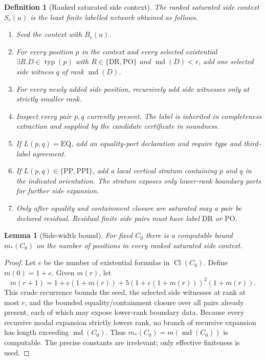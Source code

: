 \documentclass[11pt]{article}
\newtheorem{lemma}[theorem]{Lemma}
\newtheorem{definition}[theorem]{Definition}
\newcommand{\Cl}{\operatorname{Cl}}
\newcommand{\md}{\operatorname{md}}
\newcommand{\typ}{\operatorname{typ}}
\newcommand{\PP}{\mathrm{PP}}
\newcommand{\PPI}{\mathrm{PPI}}
\newcommand{\DR}{\mathrm{DR}}
\newcommand{\PO}{\mathrm{PO}}
\newcommand{\EQ}{\mathrm{EQ}}
\begin{document}
\begin{definition}[Ranked saturated side context]
\label{def:ranked-side}
The ranked saturated side context $S_r(u)$ is the least finite labelled network obtained as follows.
\begin{enumerate}[label=(S\arabic*)]
\item Seed the context with $B_r(u)$.
\item For every position $p$ in the context and every selected existential $\exists R.D\in\typ(p)$ with $R\in\{\DR,\PO\}$ and $\md(D)<r$, add one selected side witness $q$ of rank $\md(D)$.
\item For every newly added side position, recursively add side witnesses only at strictly smaller rank.
\item Inspect every pair $p,q$ currently present.  The label is inherited in completeness extraction and supplied by the candidate certificate in soundness.
\item If $L(p,q)=\EQ$, add an equality-port declaration and require type and third-label agreement.
\item If $L(p,q)\in\{\PP,\PPI\}$, add a local vertical stratum containing $p$ and $q$ in the indicated orientation.  The stratum exposes only lower-rank boundary ports for further side expansion.
\item Only after equality and containment closure are saturated may a pair be declared residual.  Residual finite side pairs must have label $\DR$ or $\PO$.
\end{enumerate}
\end{definition}

\begin{lemma}[Side-width bound]
\label{lem:side-width}
For fixed $C_0$ there is a computable bound $m_*(C_0)$ on the number of positions in every ranked saturated side context.
\end{lemma}

\begin{proof}
Let $e$ be the number of existential formulas in $\Cl(C_0)$.  Define $m(0)=1+e$.  Given $m(r)$, let
\[
 m(r+1)=1+e(1+m(r))+5(1+e(1+m(r)))^2(1+m(r)).
\]
This crude recurrence bounds the seed, the selected side witnesses at rank at most $r$, and the bounded equality/containment closure over all pairs already present, each of which may expose lower-rank boundary data.  Because every recursive modal expansion strictly lowers rank, no branch of recursive expansion has length exceeding $\md(C_0)$.  Thus $m_*(C_0)=m(\md(C_0))$ is computable.  The precise constants are irrelevant; only effective finiteness is used.
\end{proof}
\end{document}
